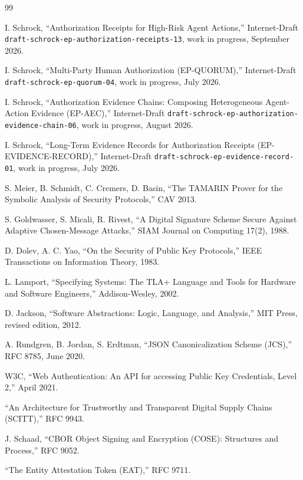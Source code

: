 \documentclass[11pt]{article}
\newcommand{\code}[1]{\texttt{#1}}
\begin{document}
\begin{thebibliography}{99}

 I. Schrock, ``Authorization Receipts for High-Risk Agent Actions,''
Internet-Draft \code{draft-schrock-ep-authorization-receipts-13}, work in progress,
September 2026.

 I. Schrock, ``Multi-Party Human Authorization (EP-QUORUM),''
Internet-Draft \code{draft-schrock-ep-quorum-04}, work in progress, July 2026.

 I. Schrock, ``Authorization Evidence Chains: Composing Heterogeneous
Agent-Action Evidence (EP-AEC),'' Internet-Draft
\code{draft-schrock-ep-authorization-evidence-chain-06}, work in progress, August
2026.

 I. Schrock, ``Long-Term Evidence Records for Authorization Receipts
(EP-EVIDENCE-RECORD),'' Internet-Draft \code{draft-schrock-ep-evidence-record-01},
work in progress, July 2026.

 S. Meier, B. Schmidt, C. Cremers, D. Basin, ``The TAMARIN Prover
for the Symbolic Analysis of Security Protocols,'' CAV 2013.

 S. Goldwasser, S. Micali, R. Rivest, ``A Digital Signature Scheme
Secure Against Adaptive Chosen-Message Attacks,'' SIAM Journal on Computing 17(2),
1988.

 D. Dolev, A. C. Yao, ``On the Security of Public Key Protocols,'' IEEE
Transactions on Information Theory, 1983.

 L. Lamport, ``Specifying Systems: The TLA+ Language and Tools for
Hardware and Software Engineers,'' Addison-Wesley, 2002.

 D. Jackson, ``Software Abstractions: Logic, Language, and
Analysis,'' MIT Press, revised edition, 2012.

 A. Rundgren, B. Jordan, S. Erdtman, ``JSON Canonicalization Scheme
(JCS),'' RFC 8785, June 2020.

 W3C, ``Web Authentication: An API for accessing Public Key
Credentials, Level 2,'' April 2021.

 ``An Architecture for Trustworthy and Transparent Digital Supply
Chains (SCITT),'' RFC 9943.

 J. Schaad, ``CBOR Object Signing and Encryption (COSE): Structures
and Process,'' RFC 9052.

 ``The Entity Attestation Token (EAT),'' RFC 9711.


\end{thebibliography}
\end{document}
